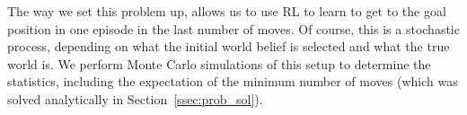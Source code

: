 The way we set this problem up, allows us to use RL to learn to get to the goal
position in one episode in the last number of moves. Of course, this is a
stochastic process, depending on what the initial world belief is selected and
what the true world is. We perform Monte Carlo simulations of this setup to determine the statistics, including the expectation of the minimum number of 
moves (which was solved analytically in Section~\ref{ssec:prob_sol}).